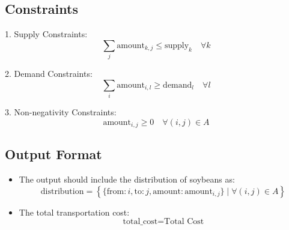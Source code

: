 \documentclass{article}
\begin{document}
\subsection*{Constraints}
1. Supply Constraints:
\[
\sum_{j} \text{amount}_{k,j} \leq \text{supply}_k \quad \forall k
\]

2. Demand Constraints:
\[
\sum_{i} \text{amount}_{i,l} \geq \text{demand}_l \quad \forall l
\]

3. Non-negativity Constraints:
\[
\text{amount}_{i,j} \geq 0 \quad \forall (i,j) \in A
\]

\subsection*{Output Format}
\begin{itemize}
    \item The output should include the distribution of soybeans as:
    \[
    \text{distribution} = \left\{ \{ \text{from}: i, \text{to}: j, \text{amount}: \text{amount}_{i,j} \} \; | \; \forall (i,j) \in A \right\}
    \]
    \item The total transportation cost:
    \[
    \text{total\_cost} = \text{Total Cost}
    \]
\end{itemize}
\end{document}
